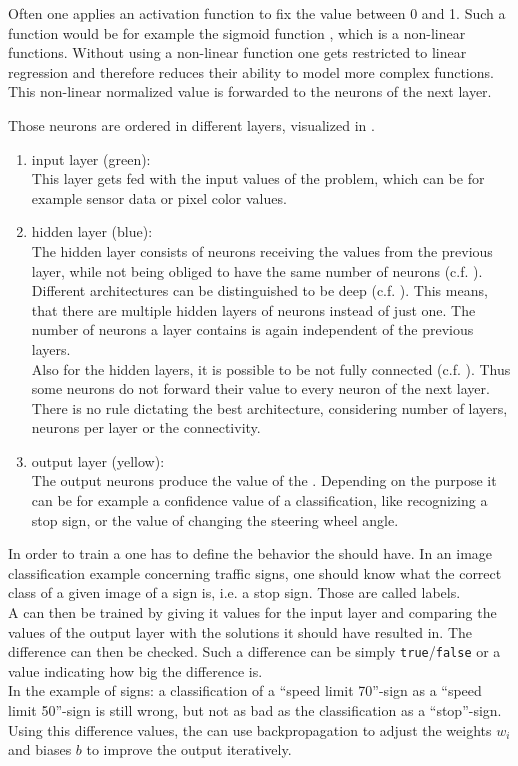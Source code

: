Often one applies an activation function to fix the value between 0 and 1. Such a function would be for example the sigmoid function \cite{von2016crc}, which is a non-linear functions. Without using a non-linear function one gets restricted to linear regression and therefore reduces their ability to model more complex functions. \cite{glorot2010understanding}
This non-linear normalized value is forwarded to the neurons of the next layer.

Those neurons are ordered in different layers, visualized in .
\begin{enumerate}
	\item input layer (green):\\ \label{item input layer}
	This layer gets fed with the input values of the problem, which can be for example sensor data or pixel color values.
	\item hidden layer (blue):\\\label{item hidden layer}
	The hidden layer consists of neurons receiving the values from the previous layer, while not being obliged to have the same number of neurons (c.f. ).
	Different architectures can be distinguished to be deep (c.f. ). This means, that there are multiple hidden layers of neurons instead of just one. The number of neurons a layer contains is again independent of the previous layers.\\
	Also for the hidden layers, it is possible to be not fully connected (c.f. ). Thus some neurons do not forward their value to every neuron of the next layer.\\
	There is no rule dictating the best architecture, considering number of layers, neurons per layer or the connectivity.
	\item output layer (yellow):\\ \label{item output layer}
	The output neurons produce the value of the \nn. Depending on the \nns purpose it can be for example a confidence value of a classification, like recognizing a stop sign, or the value of changing the steering wheel angle. 
\end{enumerate}

In order to train a \nn one has to define the behavior the \nn should have. In an image classification example concerning traffic signs, one should know what the correct class of a given image of a sign is, i.e. a stop sign. Those are called labels.\\
A \nn can then be trained by giving it values for the input layer and comparing the values of the output layer with the solutions it should have resulted in. The difference can then be checked. Such a difference can be simply \texttt{true}/\texttt{false} or a value indicating how big the difference is.\\
In the example of signs: a classification of a ``speed limit 70''-sign as a ``speed limit 50''-sign is still wrong, but not as bad as the classification as a ``stop''-sign.\\
Using this difference values, the \nn can use backpropagation \cite{kinnebrock1994neuronale} to adjust the weights $w_i$ and biases $b$ to improve the output iteratively.

